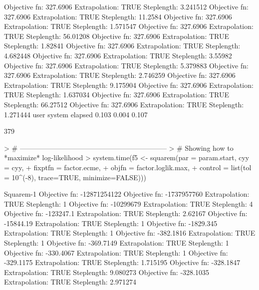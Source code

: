 \documentclass{article}
\begin{document}
\begin{Schunk}
\begin{Soutput}
Objective fn:  327.6906   Extrapolation:  TRUE   Steplength:  3.241512 
Objective fn:  327.6906   Extrapolation:  TRUE   Steplength:  11.2584 
Objective fn:  327.6906   Extrapolation:  TRUE   Steplength:  1.571547 
Objective fn:  327.6906   Extrapolation:  TRUE   Steplength:  56.01208 
Objective fn:  327.6906   Extrapolation:  TRUE   Steplength:  1.82841 
Objective fn:  327.6906   Extrapolation:  TRUE   Steplength:  4.682448 
Objective fn:  327.6906   Extrapolation:  TRUE   Steplength:  3.55982 
Objective fn:  327.6906   Extrapolation:  TRUE   Steplength:  5.379883 
Objective fn:  327.6906   Extrapolation:  TRUE   Steplength:  2.746259 
Objective fn:  327.6906   Extrapolation:  TRUE   Steplength:  9.175904 
Objective fn:  327.6906   Extrapolation:  TRUE   Steplength:  1.637034 
Objective fn:  327.6906   Extrapolation:  TRUE   Steplength:  66.27512 
Objective fn:  327.6906   Extrapolation:  TRUE   Steplength:  1.271444 
   user  system elapsed 
  0.103   0.004   0.107 
\end{Soutput}
\begin{Soutput}
[1] 379
\end{Soutput}
\begin{Sinput}
> # ---------------------------------------------------------------
> # Showing how to *maximize* log-likelihood
> system.time(f5 <- squarem(par = param.start, cyy = cyy, 
+                           fixptfn = factor.ecme, 
+                           objfn = factor.loglik.max, 
+                           control = list(tol = 10^(-8), trace=TRUE, minimize=FALSE)))
\end{Sinput}
\begin{Soutput}
Squarem-1 
 Objective fn:  -12871254122 
Objective fn:  -1737957760   Extrapolation:  TRUE   Steplength:  1 
Objective fn:  -10299679   Extrapolation:  TRUE   Steplength:  4 
Objective fn:  -123247.1   Extrapolation:  TRUE   Steplength:  2.62167 
Objective fn:  -15844.19   Extrapolation:  TRUE   Steplength:  1 
Objective fn:  -1829.345   Extrapolation:  TRUE   Steplength:  1 
Objective fn:  -382.1816   Extrapolation:  TRUE   Steplength:  1 
Objective fn:  -369.7149   Extrapolation:  TRUE   Steplength:  1 
Objective fn:  -330.4067   Extrapolation:  TRUE   Steplength:  1 
Objective fn:  -329.1175   Extrapolation:  TRUE   Steplength:  1.715195 
Objective fn:  -328.1847   Extrapolation:  TRUE   Steplength:  9.080273 
Objective fn:  -328.1035   Extrapolation:  TRUE   Steplength:  2.971274 

\end{Soutput}
\end{Schunk}
\end{document}
